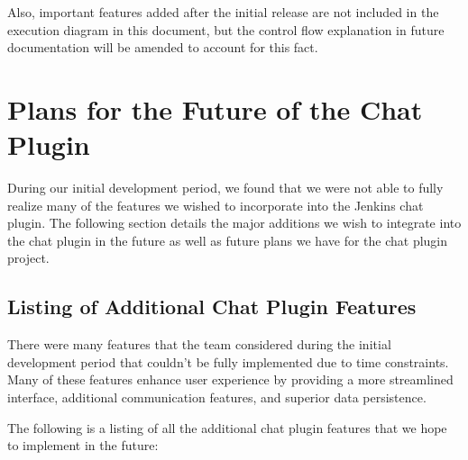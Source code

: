 \documentclass{article}
\begin{document}
			Also, important features added after the initial release are not 
			included in the execution diagram in this document, but the control 
			flow explanation in future documentation will be amended to account 
			for this fact.


	\section[Future Plans]{Plans for the Future of the Chat Plugin}
	During our initial development period, we found that we were not able to
	fully realize many of the features we wished to incorporate into the
	Jenkins chat plugin.  The following section details the major additions
	we wish to integrate into the chat plugin in the future as well as future
	plans we have for the chat plugin project.

		\subsection[Additional Features]{Listing of Additional Chat Plugin Features}
		There were many features that the team considered during the initial
		development period that couldn't be fully implemented due to time
		constraints.  Many of these features enhance user experience by providing
		a more streamlined interface, additional communication features, and
		superior data persistence.

		The following is a listing of all the additional chat plugin features
		that we hope to implement in the future:
\end{document}
